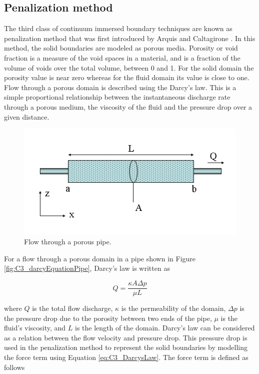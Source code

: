 \subsection{Penalization method}
The third class of continuum immersed boundary techniques are known as penalization method that was first introduced by Arquis and Caltagirone \cite{ arquis1984conditions}. In this method, the solid boundaries are modeled as porous media. Porosity or void fraction is a measure of the void spaces in a material, and is a fraction of the volume of voids over the total volume, between 0 and 1. For the solid domain the porosity value is near zero whereas for the fluid domain its value is close to one. Flow through a porous domain is described using the Darcy's law. This is a simple proportional relationship between the instantaneous discharge rate through a porous medium, the viscosity of the fluid and the pressure drop over a given distance.

\begin{figure}[H]
	\centering
	\includegraphics[width=14.cm]{Chapter_3/figure/Darcys_Law.png}
	\caption{Flow through a porous pipe.}
\end{figure}

For a flow through a porous domain in a pipe shown in Figure \ref{fig:C3_darcyEquationPipe}, Darcy's law is written as

\begin{equation}\label{eq:C3_DarcysLaw}
	Q = \frac{\kappa A \Delta p}{\mu L}
\end{equation}

where $Q$ is the total flow discharge, $\kappa$ is the permeability of the domain, $\Delta p$ is the pressure drop due to the porosity between two ends of the pipe, $\mu$ is the fluid's viscosity, and $L$ is the length of the domain. Darcy's law can be considered as a relation between the flow velocity and pressure drop. This pressure drop  is used in the penalization method to represent the solid boundaries by modelling the force term using Equation \eqref{eq:C3_DarcysLaw}. The force term is defined as follows

